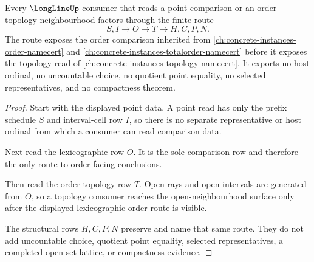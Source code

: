 \begin{theorem}
\label{thm:long-line-lexicographic-order-route}
Every $\LongLineUp$ consumer that reads a point comparison or an order-topology neighbourhood factors through the finite route
$$
S,I \longrightarrow O \longrightarrow T \longrightarrow H,C,P,N .
$$
The route exposes the order comparison inherited from \autoref{ch:concrete-instances-order-namecert} and \autoref{ch:concrete-instances-totalorder-namecert} before it exposes the topology read of \autoref{ch:concrete-instances-topology-namecert}. It exports no host ordinal, no uncountable choice, no quotient point equality, no selected representatives, and no compactness theorem.
\end{theorem}
\begin{proof}
Start with the displayed point data. A point read has only the prefix schedule $S$ and interval-cell row $I$, so there is no separate representative or host ordinal from which a consumer can read comparison data.

Next read the lexicographic row $O$. It is the sole comparison row and therefore the only route to order-facing conclusions.

Then read the order-topology row $T$. Open rays and open intervals are generated from $O$, so a topology consumer reaches the open-neighbourhood surface only after the displayed lexicographic order route is visible.

The structural rows $H,C,P,N$ preserve and name that same route. They do not add uncountable choice, quotient point equality, selected representatives, a completed open-set lattice, or compactness evidence.
\end{proof}

